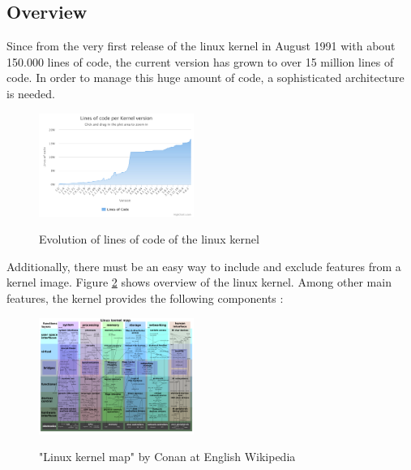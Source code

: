 \documentclass{sig-alternate-05-2015}
\begin{document}
\subsection{Overview}
Since from the very first release of the linux kernel in August 1991 \cite{linuxtimeline} with about 150.000 lines of code, the current version has grown to over 15 million lines of code. In order to manage this huge amount of code, a sophisticated architecture is needed.
\begin{figure}[h]
\centering
\includegraphics[width= 0.45\textwidth ]{img/chart.pdf}
\label{kconfig-compil}
\caption{Evolution of lines of code of the linux kernel \cite{linuxcounter}}
\end{figure}

Additionally, there must be an easy way to include and exclude features from a kernel image. 
Figure \ref{fig:kernelmap} shows overview of the linux kernel. Among other main features, the kernel provides the following  components \cite{mauerer2010professional}:
\begin{figure}[h]
\centering
\includegraphics[width= 0.45\textwidth ]{img/Linux_kernel_map.png}
\label{fig:kernelmap}
\caption{"Linux kernel map" by Conan at English Wikipedia \cite{kernelmap}}
\end{figure}
\end{document}
